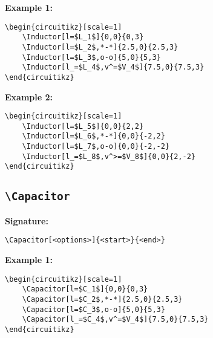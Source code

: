\documentclass[a4paper,12pt]{article}
\begin{document}
\textbf{Example 1:}

\begin{lstlisting}[style=latexstyle]
\begin{circuitikz}[scale=1]
	\Inductor[l=$L_1$]{0,0}{0,3}
	\Inductor[l=$L_2$,*-*]{2.5,0}{2.5,3}
	\Inductor[l=$L_3$,o-o]{5,0}{5,3}
	\Inductor[l_=$L_4$,v^=$V_4$]{7.5,0}{7.5,3}
\end{circuitikz}
\end{lstlisting}


\begin{center}
\begin{circuitikz}[scale=1]
\end{circuitikz}
\end{center}

\textbf{Example 2:}

\begin{lstlisting}[style=latexstyle]
\begin{circuitikz}[scale=1]
	\Inductor[l=$L_5$]{0,0}{2,2}
	\Inductor[l=$L_6$,*-*]{0,0}{-2,2}
	\Inductor[l=$L_7$,o-o]{0,0}{-2,-2}
	\Inductor[l_=$L_8$,v^>=$V_8$]{0,0}{2,-2}
\end{circuitikz}
\end{lstlisting}

\begin{center}
\begin{circuitikz}[scale=1]
\end{circuitikz}
\end{center}

\subsection{\texttt{\textbackslash Capacitor}}

\textbf{Signature:}
\begin{verbatim}
\Capacitor[<options>]{<start>}{<end>}
\end{verbatim}

\textbf{Example 1:}

\begin{lstlisting}[style=latexstyle]
\begin{circuitikz}[scale=1]
	\Capacitor[l=$C_1$]{0,0}{0,3}
	\Capacitor[l=$C_2$,*-*]{2.5,0}{2.5,3}
	\Capacitor[l=$C_3$,o-o]{5,0}{5,3}
	\Capacitor[l_=$C_4$,v^=$V_4$]{7.5,0}{7.5,3}
\end{circuitikz}
\end{lstlisting}
\end{document}
